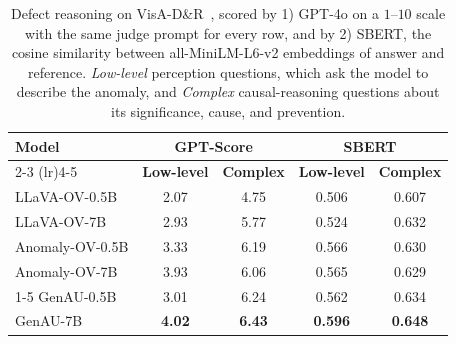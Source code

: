 \begin{table}
\small
\centering
\setlength{\tabcolsep}{2pt}
\caption{Defect reasoning on VisA-D\&R~\cite{xu2025towards}, scored by 1) GPT-4o on a $1$--$10$ scale with the same judge prompt for every row, and by 2) SBERT, the cosine similarity between all-MiniLM-L6-v2 embeddings of answer and reference. \emph{Low-level} perception questions, which ask the model to describe the anomaly, and \emph{Complex} causal-reasoning questions about its significance, cause, and prevention.}
\label{tab:reasoning}
\begin{tabular}{@{}lcccc@{}}

\toprule
\multirow{2}{*}{\textbf{Model}} & \multicolumn{2}{c}{\textbf{GPT-Score}} & \multicolumn{2}{c}{\textbf{SBERT}} \\
\cmidrule(lr){2-3} \cmidrule(lr){4-5}
 & \textbf{Low-level} & \textbf{Complex} & \textbf{Low-level} & \textbf{Complex} \\
\midrule
LLaVA-OV-0.5B   & 2.07 & 4.75 & 0.506 & 0.607 \\
LLaVA-OV-7B     & 2.93 & 5.77 & 0.524 & 0.632 \\
Anomaly-OV-0.5B & 3.33 & 6.19 & 0.566 & 0.630 \\
Anomaly-OV-7B   & 3.93 & 6.06 & 0.565 & 0.629 \\
\cmidrule(lr){1-5}
GenAU-0.5B & 3.01 & 6.24 & 0.562 & 0.634 \\
GenAU-7B   & \textbf{4.02} & \textbf{6.43} & \textbf{0.596} & \textbf{0.648} \\

\bottomrule
\end{tabular}
\end{table}

